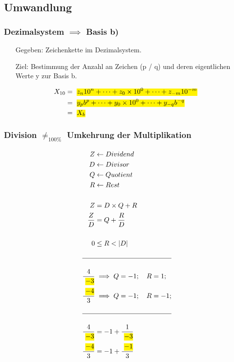 \documentclass[a4paper]{scrartcl}
\begin{document}
			\subsection{Umwandlung}
				\subsubsection{Dezimalsystem \(\implies\) Basis b)}
					\begin{itemize}
						\item[Gegeben:] 
							Zeichenkette im Dezimalsystem.
						\item[Ziel:] 
							Bestimmung der Anzahl an Zeichen (p / q) und deren eigentlichen Werte y zur Basis b. 
					\end{itemize}
				\begin{align*}
					X_{10} &=  \text{ \hl{$ z_n 10^n + \dots + z_0 \times 10^0 + \dots + z_{-m} 10^{-m} $} } \\
								&= \text{ \hl{$ y_p b^p + \dots + y_0 \times 10^0 + \dots + y_{-q} b^{-q}  $} }\\
								&= \text{ \hl{$ X_b $} }
				\end{align*}
			
		\subsubsection{Division \( \neq_{100\%} \) Umkehrung der Multiplikation }
			\begin{align*}
			Z &\gets Dividend \\ 
			D &\gets Divisor \\
			Q &\gets Quotient \\
			R &\gets Rest \\
			\\
			Z &= D \times Q + R\\
			\frac{Z}{D} &= Q + \frac{R}{D}\\
			\\
			0 &\leq R < |D|\\
			\\
			\hline
			\\
			\frac{4}{\text{ \hl{$ - 3 $}}} &\implies Q = -1; \quad R =  1; \\ 
			\frac{\text{ \hl{$ - 4 $}}}{3} &\implies Q = -1; \quad R = -1; \\
			\\
			\hline
			\\
			\frac{4}{\text{ \hl{$ - 3 $}}} &= - 1 + \frac{1}{\text{ \hl{$ - 3 $}}} \\
			\frac{\text{ \hl{$ - 4 $}}}{3} &= - 1 + \frac{\text{ \hl{$ - 1 $}}}{3}
			\end{align*}		
			
\end{document}
